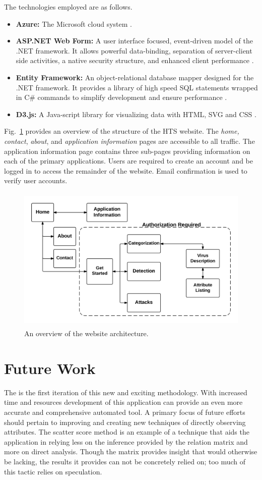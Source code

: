 The technologies employed are as follows.
\begin{itemize}
	\item \textbf{Azure:} The Microsoft cloud system \cite{Azure}.
	\item \textbf{ASP.NET Web Form:} A user interface focused, event-driven model of the .NET framework.
	It allows powerful data-binding, separation of server-client side activities, a native security structure, and enhanced client performance \cite{ASP}.
	\item \textbf{Entity Framework:} An object-relational database mapper designed for the .NET framework.
	It provides a library of high speed SQL statements wrapped in C\# commands to simplify development and ensure performance \cite{Entity}.
	\item \textbf{D3.js:} A Java-script library for visualizing data with HTML, SVG and CSS \cite{D3}.
\end{itemize}
Fig.~\ref{fig:WebsiteArchitecture} provides an overview of the structure of the HTS website.
The \textit{home, contact}, \textit{about}, and \textit{application information} pages are accessible to all traffic.
The application information page contains three sub-pages providing information on each of the primary applications.
Users are required to create an account and be logged in to access the remainder of the website.
Email confirmation is used to verify user accounts.
\begin{figure}[h]
	\centering
	\includegraphics[height = 7cm]{figures/WebsiteArchitecture}
	\caption{An overview of the website architecture.}
	\label{fig:WebsiteArchitecture}
\end{figure}

\section{Future Work}
The \NameNoPeriod is the first iteration of this new and exciting methodology. 
With increased time and resources development of this application can provide an even more accurate and comprehensive automated tool.
A primary focus of future efforts should pertain to improving and creating new techniques of directly observing attributes.
The scatter score method is an example of a technique that aids the application in relying less on the inference provided by the relation matrix and more on direct analysis.
Though the matrix provides insight that would otherwise be lacking, the results it provides can not be concretely relied on; too much of this tactic relies on speculation.

